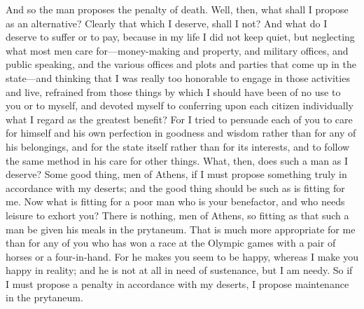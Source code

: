 \documentclass[letterpaper,12pt]{article}
\newcommand{\stephpag}[1]{\marginnote{\small\itshape\fontfamily{ppl}\selectfont #1}}
\begin{document}
And so the man proposes the penalty of death. Well, then, what shall I propose as an alternative? Clearly that which I deserve, shall I not? And what do I deserve to suffer or to pay, because in my life I did not keep quiet, but neglecting what most men care for---money-making and property, and military offices, and public speaking, and the various offices and plots and parties that come up in the state---and thinking that I was really too honorable \stephpag{c} to engage in those activities and live, refrained from those things by which I should have been of no use to you or to myself, and devoted myself to conferring upon each citizen individually what I regard as the greatest benefit? For I tried to persuade each of you to care for himself and his own perfection in goodness and wisdom rather than for any of his belongings, and for the state itself rather than for its interests, and to follow the same method in his care for other things. What, then, does such a man as I deserve? \stephpag{d} Some good thing, men of Athens, if I must propose something truly in accordance with my deserts; and the good thing should be such as is fitting for me. Now what is fitting for a poor man who is your benefactor, and who needs leisure to exhort you? There is nothing, men of Athens, so fitting as that such a man be given his meals in the prytaneum. That is much more appropriate for me than for any of you who has won a race at the Olympic games with a pair of horses or a four-in-hand. For he makes you seem to be happy, whereas I make you happy in reality; \stephpag{e} and he is not at all in need of sustenance, but I am needy. So if I must propose a penalty in accordance with my deserts, \stephpag{37 a} I propose maintenance in the prytaneum.
\end{document}
